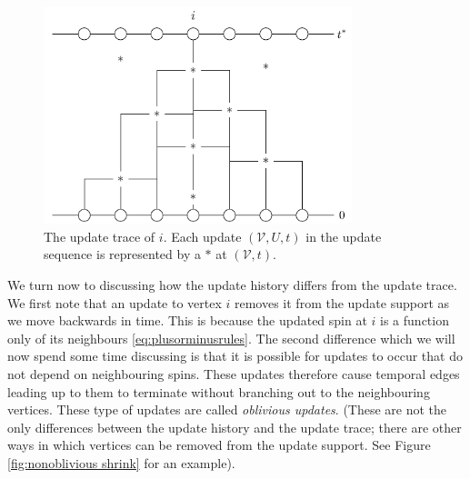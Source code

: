 	\begin{figure}
		\centering
		\includegraphics[width = 0.8\textwidth]{Figures/IsingCouplingTime/example_update_trace_construction.pdf}
		\caption[The update trace of i]{The update trace of $i$. Each update $(\mathcal{V}, U, t)$ in the update sequence is represented by a $*$ at $(\mathcal{V}, t)$.}
		\label{fig:example trace construction}
	\end{figure}

	We turn now to discussing how the update history differs from the update trace. We first note that an update to vertex $i$ removes it from the update support as we move backwards in time. This is because the updated spin at $i$ is a function only of its neighbours \eqref{eq:plusorminusrules}. The second difference which we will now spend some time discussing is that it is possible for updates to occur that do not depend on neighbouring spins. These updates therefore cause temporal edges leading up to them to terminate without branching out to the neighbouring vertices. These type of updates are called \emph{oblivious updates}. (These are not the only differences between the update history and the update trace; there are other ways in which vertices can be removed from the update support. See Figure \ref{fig:nonoblivious shrink} for an example).


